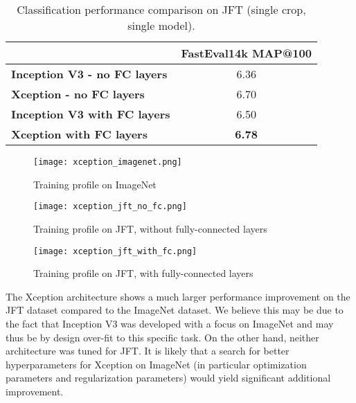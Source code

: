 \documentclass[10pt,twocolumn,letterpaper]{article}
\begin{document}
\begin{table}[!ht]
\centering
\caption{Classification performance comparison on JFT (single crop, single model).}
\label{jftperf}

  \begin{tabular}{lc}
  \toprule
                         & \textbf{FastEval14k MAP@100}   \\ \hline
  \textbf{Inception V3 - no FC layers}    &   6.36            \\ \hline
  \textbf{Xception - no FC layers}        &   6.70            \\ \hline
  \textbf{Inception V3 with FC layers}  &   6.50            \\ \hline
  \textbf{Xception with FC layers}      & \textbf{6.78}     \\ \hline

  \end{tabular}

\end{table}


\begin{figure}[!ht]
  \caption{Training profile on ImageNet}
  \label{xception_imagenet}
  \centering
    \texttt{[image: xception\_imagenet.png]}
\end{figure}

\begin{figure}[!ht]
  \caption{Training profile on JFT, without fully-connected layers}
  \label{xception_jft_no_fc}
  \centering
    \texttt{[image: xception\_jft\_no\_fc.png]}
\end{figure}

\begin{figure}[!ht]
  \caption{Training profile on JFT, with fully-connected layers}
  \label{xception_jft_with_fc}
  \centering
    \texttt{[image: xception\_jft\_with\_fc.png]}
\end{figure}


The Xception architecture shows a much larger performance improvement on the JFT dataset compared to the ImageNet dataset. We believe this may be due to the fact that Inception V3 was developed with a focus on ImageNet and may thus be by design over-fit to this specific task. On the other hand, neither architecture was tuned for JFT. It is likely that a search for better hyperparameters for Xception on ImageNet (in particular optimization parameters and regularization parameters) would yield significant additional improvement.
\end{document}
